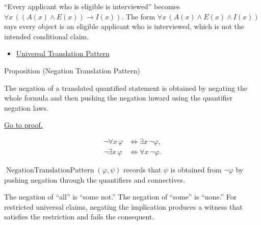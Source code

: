 \begin{remark*}[Exposition]
``Every applicant who is eligible is interviewed'' becomes
\(\forall x\,((A(x)\land E(x))\to I(x))\). The form
\(\forall x\,(A(x)\land E(x)\land I(x))\) says every object is an eligible
applicant who is interviewed, which is not the intended conditional claim.
\end{remark*}

\begin{dependencies}
\begin{itemize}
  \item \hyperref[prop:universal-translation-pattern]{Universal Translation Pattern}
\end{itemize}
\end{dependencies}

\begin{propositionbox}{Proposition (Negation Translation Pattern)}
\begin{proposition}
\label{prop:negation-translation-pattern}
The negation of a translated quantified statement is obtained by negating the
whole formula and then pushing the negation inward using the quantifier
negation laws.

\noindent\hyperref[prf:negation-translation-pattern]{Go to proof.}
\end{proposition}
\end{propositionbox}

\begin{remark*}
\[
\begin{aligned}
\neg\forall x\,\varphi &\Longleftrightarrow \exists x\,\neg\varphi,\\
\neg\exists x\,\varphi &\Longleftrightarrow \forall x\,\neg\varphi.
\end{aligned}
\]
\end{remark*}

\begin{remark*}
\(\operatorname{NegationTranslationPattern}(\varphi,\psi)\) records that
\(\psi\) is obtained from \(\neg\varphi\) by pushing negation through the
quantifiers and connectives.
\end{remark*}

\begin{remark*}[Interpretation]
The negation of ``all'' is ``some not.'' The negation of ``some'' is ``none.''
For restricted universal claims, negating the implication produces a witness
that satisfies the restriction and fails the consequent.
\end{remark*}

